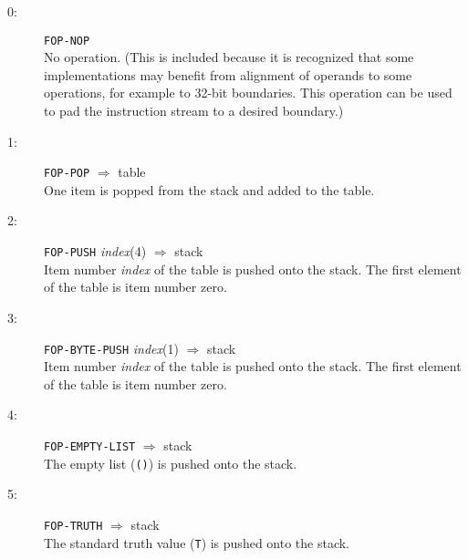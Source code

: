 \begin{description}
\item[0:] \hspace{2em} {\tt FOP-NOP} \\
No operation.  (This is included because it is recognized
that some implementations may benefit from alignment of operands to some
operations, for example to 32-bit boundaries.  This operation can be used
to pad the instruction stream to a desired boundary.)

\item[1:] \hspace{2em} {\tt FOP-POP} \hspace{2em} $\Rightarrow$ \hspace{2em} table \\
One item is popped from the stack and added to the table.

\item[2:] \hspace{2em} {\tt FOP-PUSH} \hspace{2em} {\it index}(4) \hspace{2em} $\Rightarrow$ \hspace{2em} stack \\
Item number {\it index} of the table is pushed onto the stack.
The first element of the table is item number zero.

\item[3:] \hspace{2em} {\tt FOP-BYTE-PUSH} \hspace{2em} {\it index}(1) \hspace{2em} $\Rightarrow$ \hspace{2em} stack \\
Item number {\it index} of the table is pushed onto the stack.
The first element of the table is item number zero.

\item[4:] \hspace{2em} {\tt FOP-EMPTY-LIST} \hspace{2em} $\Rightarrow$ \hspace{2em} stack \\
The empty list ({\tt ()}) is pushed onto the stack.

\item[5:] \hspace{2em} {\tt FOP-TRUTH} \hspace{2em} $\Rightarrow$ \hspace{2em} stack \\
The standard truth value ({\tt T}) is pushed onto the stack.


\end{description}
